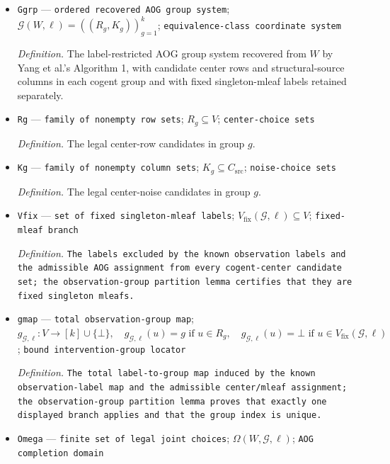 \documentclass{article}
\begin{document}
\begin{itemize}
  \item \texttt{Ggrp} --- \texttt{ordered recovered AOG group system}; \(\mathcal G(W,\ell)=((R_g,K_g))_{g=1}^{k}\); \texttt{equivalence-\allowbreak{}class coordinate system}
  \par\smallskip\noindent\emph{Definition.} The label-restricted AOG group system recovered from \(W\) by Yang et al.'s Algorithm 1, with candidate center rows and structural-source columns in each cogent group and with fixed singleton-mleaf labels retained separately.
  \item \texttt{Rg} --- \texttt{family of nonempty row sets}; \(R_g\subseteq V\); \texttt{center-\allowbreak{}choice sets}
  \par\smallskip\noindent\emph{Definition.} The legal center-row candidates in group \(g\).
  \item \texttt{Kg} --- \texttt{family of nonempty column sets}; \(K_g\subseteq C_{\mathrm{src}}\); \texttt{noise-\allowbreak{}choice sets}
  \par\smallskip\noindent\emph{Definition.} The legal center-noise candidates in group \(g\).
  \item \texttt{Vfix} --- \texttt{set of fixed singleton-\allowbreak{}mleaf labels}; \(V_{\mathrm{fix}}(\mathcal G,\ell)\subseteq V\); \texttt{fixed-\allowbreak{}mleaf branch}
  \par\smallskip\noindent\emph{Definition.} \texttt{The labels excluded by the known observation labels and the admissible AOG assignment from every cogent-\allowbreak{}center candidate set;\allowbreak{} the observation-\allowbreak{}group partition lemma certifies that they are fixed singleton mleafs.}
  \item \texttt{gmap} --- \texttt{total observation-\allowbreak{}group map}; \(g_{\mathcal G,\ell}:V\to[k]\cup\{\bot\},\quad g_{\mathcal G,\ell}(u)=g\text{ if }u\in R_g,\quad g_{\mathcal G,\ell}(u)=\bot\text{ if }u\in V_{\mathrm{fix}}(\mathcal G,\ell)\); \texttt{bound intervention-\allowbreak{}group locator}
  \par\smallskip\noindent\emph{Definition.} \texttt{The total label-\allowbreak{}to-\allowbreak{}group map induced by the known observation-\allowbreak{}label map and the admissible center/\allowbreak{}mleaf assignment;\allowbreak{} the observation-\allowbreak{}group partition lemma proves that exactly one displayed branch applies and that the group index is unique.}
  \item \texttt{Omega} --- \texttt{finite set of legal joint choices}; \(\Omega(W,\mathcal G,\ell)\); \texttt{AOG completion domain}

\end{itemize}
\end{document}
